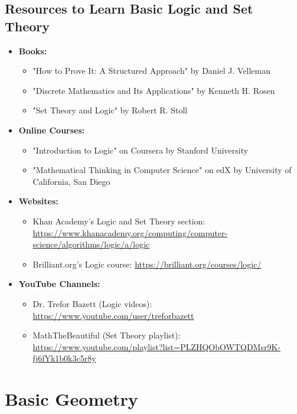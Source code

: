 \documentclass[openany]{book}
\begin{document}
\subsection{Resources to Learn Basic Logic and Set Theory}
\begin{itemize}
    \item \textbf{Books:}
    \begin{itemize}
        \item "How to Prove It: A Structured Approach" by Daniel J. Velleman
        \item "Discrete Mathematics and Its Applications" by Kenneth H. Rosen
        \item "Set Theory and Logic" by Robert R. Stoll
    \end{itemize}
    \item \textbf{Online Courses:}
    \begin{itemize}
        \item "Introduction to Logic" on Coursera by Stanford University
        \item "Mathematical Thinking in Computer Science" on edX by University of California, San Diego
    \end{itemize}
    \item \textbf{Websites:}
    \begin{itemize}
        \item Khan Academy's Logic and Set Theory section: \url{https://www.khanacademy.org/computing/computer-science/algorithms/logic/a/logic}
        \item Brilliant.org's Logic course: \url{https://brilliant.org/courses/logic/}
    \end{itemize}
    \item \textbf{YouTube Channels:}
    \begin{itemize}
        \item Dr. Trefor Bazett (Logic videos): \url{https://www.youtube.com/user/treforbazett}
        \item MathTheBeautiful (Set Theory playlist): \url{https://www.youtube.com/playlist?list=PLZHQObOWTQDMsr9K-fj6fYk1b0k3c5r8y}
    \end{itemize}
\end{itemize}

\section{Basic Geometry}
\end{document}
